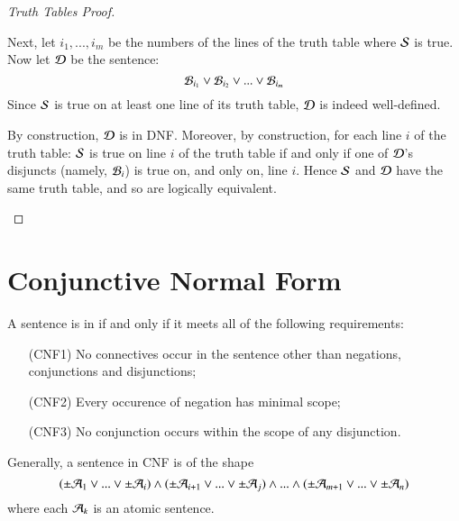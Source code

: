 \begin{proof}[Truth Tables Proof]
\begin{enumerate}
            Next, let $i_1,...,i_m$ be the numbers of the lines of the truth table where $\mathcal{S}$ is true. Now let $\mathcal{D}$ be the sentence: \begin{equation*}
                \mathcal{B}_{i_1}\vee\mathcal{B}_{i_2}\vee ...\vee \mathcal{B}_{i_m}
            \end{equation*}
            Since $\mathcal{S}$ is true on at least one line of its truth table, $\mathcal{D}$ is indeed well-defined. 


            By construction, $\mathcal{D}$ is in DNF. Moreover, by construction, for each line $i$ of the truth table: $\mathcal{S}$ is true on line $i$ of the truth table if and only if one of $\mathcal{D}$'s disjuncts (namely, $\mathcal{B}_i$) is true on, and only on, line $i$. Hence $\mathcal{S}$ and $\mathcal{D}$ have the same truth table, and so are logically equivalent.
    \end{enumerate}
\end{proof}

\section{ Conjunctive Normal Form}

\begin{definition}
    A sentence is in  if and only if it meets all of the following requirements: \begin{itemize}[leftmargin=+1in]
        \item[(CNF1)] No connectives occur in the sentence other than negations, conjunctions and disjunctions;
        \item[(CNF2)] Every occurence of negation has minimal scope;
        \item[(CNF3)] No conjunction occurs within the scope of any disjunction.
    \end{itemize}
\end{definition}

\begin{remark}
    Generally, a sentence in CNF is of the shape \begin{equation*}
        (\pm\mathcal{A}_1\vee ...\vee\pm\mathcal{A}_i)\wedge(\pm\mathcal{A}_{i+1}\vee ...\vee\pm\mathcal{A}_j)\wedge...\wedge(\pm\mathcal{A}_{m+1}\vee ...\vee\pm\mathcal{A}_n)
    \end{equation*}
    where each $\mathcal{A}_k$ is an atomic sentence.
\end{remark}

